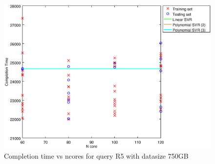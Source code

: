 
\begin {figure}[hbtp]
\centering
\includegraphics[width=\textwidth]{output/R5_750_ONLY_1_OVER_NCORES/plot_R5_750_bestmodels.eps}
\caption{Completion time vs ncores for query R5 with datasize 750GB}
\label{fig:all_nonlinear_R5_750}
\end {figure}
